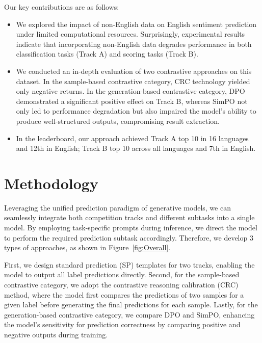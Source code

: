 \documentclass[11pt]{article}
\begin{document}
Our key contributions are as follows:

\begin{itemize}
	\item We explored the impact of non-English data on English sentiment prediction under limited computational resources. Surprisingly, experimental results indicate that incorporating non-English data degrades performance in both classification tasks (Track A) and scoring tasks (Track B).
	\item We conducted an in-depth evaluation of two contrastive approaches on this dataset. In the sample-based contrastive category, CRC technology yielded only negative returns. In the generation-based contrastive category, DPO demonstrated a significant positive effect on Track B, whereas SimPO not only led to performance degradation but also impaired the model's ability to produce well-structured outputs, compromising result extraction.
	\item In the leaderboard, our approach achieved Track A top 10 in 16 languages and 12th in English; Track B top 10 across all languages and 7th in English.
\end{itemize}

\section{Methodology}


Leveraging the unified prediction paradigm of generative models, we can seamlessly integrate both competition tracks and different subtasks into a single model. By employing task-specific prompts during inference, we direct the model to perform the required prediction subtask accordingly. Therefore, we develop 3 types of approaches, as shown in Figure~\ref{fig:Overall}.

First, we design standard prediction (SP) templates for two tracks, enabling the model to output all label predictions directly. Second, for the sample-based contrastive category, we adopt the contrastive reasoning calibration (CRC) method, where the model first compares the predictions of two samples for a given label before generating the final predictions for each sample. Lastly, for the generation-based contrastive category, we compare DPO and SimPO, enhancing the model’s sensitivity for prediction correctness by comparing positive and negative outputs during training.
\end{document}
